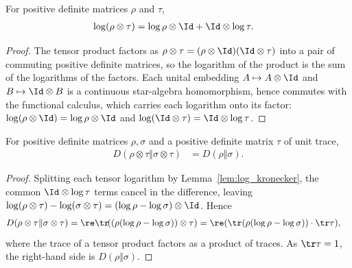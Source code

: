 \begin{lemma}
    \label{lem:log_kronecker}
    \leanok
    For positive definite matrices $\rho$ and $\tau$,
    \begin{align}
        \log(\rho\otimes\tau)
         & =\log\rho\otimes\Id+\Id\otimes\log\tau.
        \label{eq:entropy_log_tensor}
    \end{align}
\end{lemma}

\begin{proof}\leanok
    The tensor product factors as
    $\rho\otimes\tau=(\rho\otimes\Id)(\Id\otimes\tau)$ into a
    pair of commuting positive definite matrices, so the logarithm of the product
    is the sum of the logarithms of the factors. Each unital embedding
    $A\mapsto A\otimes\Id$ and $B\mapsto\Id\otimes B$ is a
    continuous star-algebra homomorphism, hence commutes with the functional
    calculus, which carries each logarithm onto its factor:
    $\log(\rho\otimes\Id)=\log\rho\otimes\Id$ and
    $\log(\Id\otimes\tau)=\Id\otimes\log\tau$.
\end{proof}

\begin{theorem}
    \label{thm:relative_entropy_ancilla_additivity}
    \leanok
    For positive definite matrices $\rho,\sigma$ and a positive definite matrix
    $\tau$ of unit trace,
    \begin{align}
        D(\rho\otimes\tau\Vert\sigma\otimes\tau)
         & =D(\rho\Vert\sigma).
        \label{eq:entropy_ancilla_additivity}
    \end{align}
\end{theorem}

\begin{proof}\leanok
    Splitting each tensor logarithm by Lemma~\ref{lem:log_kronecker}, the common
    $\Id\otimes\log\tau$ terms cancel in the difference, leaving
    $\log(\rho\otimes\tau)-\log(\sigma\otimes\tau)
        =(\log\rho-\log\sigma)\otimes\Id$. Hence
    \begin{align}
        D(\rho\otimes\tau\Vert\sigma\otimes\tau)
         & =\re\tr\!((\rho(\log\rho-\log\sigma))\otimes\tau)
        =\re(\tr(\rho(\log\rho-\log\sigma))\cdot\tr\tau),
        \notag
    \end{align}
    where the trace of a tensor product factors as a product of traces. As
    $\tr\tau=1$, the right-hand side is $D(\rho\Vert\sigma)$.
\end{proof}


